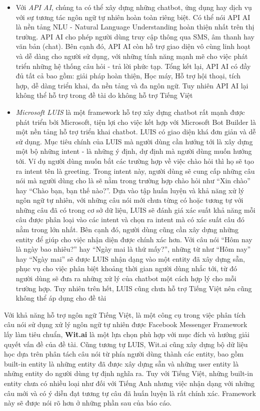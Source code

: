 \documentclass[12pt]{report}
\begin{document}
\begin{itemize}
	\item Với \textit{API AI}, chúng ta có thể xây dựng những chatbot, ứng dụng hay dịch vụ với sự tương tác ngôn ngữ tự nhiên hoàn toàn riêng biệt. Có thể nói API AI là nền tảng NLU - Natural Language Understanding hoàn thiện nhất trên thị trường. API AI cho phép người dùng truy cập thông qua SMS, âm thanh hay văn bản (chat). Bên cạnh đó, API AI còn hỗ trợ giao diện vô cùng linh hoạt và dễ dàng cho người sử dụng, với những tính năng mạnh mẽ cho việc phát triển những hệ thống câu hỏi - trả lời phức tạp. Tổng kết lại, API AI có đầy đủ tất cả bao gồm: giải pháp hoàn thiện, Học máy, Hỗ trợ hội thoại, tích hợp, dễ dàng triển khai, đa nền tảng và đa ngôn ngữ. Tuy nhiên API AI lại không thể hỗ trợ trong đề tài do không hỗ trợ Tiếng Việt
	\item \textit{Microsoft LUIS} là một framework hỗ trợ xây dựng chatbot rất mạnh được phát triển bởi Microsoft, tiện lợi cho việc kết hợp với Microsoft Bot Builder là một nền tảng hỗ trợ triển khai chatbot. LUIS có giao diện khá đơn giản và dễ sử dụng. Mục tiêu chính của LUIS mà người dùng cần hướng tới là xây dựng một bộ những intent - là những ý định, dự định mà người dùng muốn hướng tới. Ví dụ người dùng muốn bắt các trường hợp về việc chào hỏi thì họ sẽ tạo ra intent tên là greeting. Trong intent này, người dùng sẽ cung cấp những câu nói mà người dùng cho là sẽ nằm trong trường hợp chào hỏi như ``Xin chào'' hay ``Chào bạn, bạn thế nào?''. Dựa vào tập huấn luyện và khả năng xử lý ngôn ngữ tự nhiên, với những câu nói mới chưa từng có hoặc tương tự với những câu đã có trong cơ sở dữ liệu, LUIS sẽ đánh giá xác suất khả năng mỗi câu được phân loại vào các intent và chọn ra intent mà có xác suất câu đó nằm trong lớn nhất. Bên cạnh đó, người dùng cũng cần xây dựng những entity để giúp cho việc nhận diện được chính xác hơn. Với câu nói ``Hôm nay là ngày bao nhiêu?'' hay ``Ngày mai là thứ mấy?'', những từ như ``Hôm nay'' hay ``Ngày mai'' sẽ được LUIS nhận dạng vào một entity đã xây dựng sẵn, phục vụ cho việc phân biệt khoảng thời gian người dùng nhắc tới, từ đó người dùng sẽ đưa ra những xử lý của chatbot một cách hợp lý cho mỗi trường hợp. Tuy nhiên trên hết, LUIS cũng chưa hỗ trợ Tiếng Việt nên cũng không thể áp dụng cho đề tài
\end{itemize}

Với khả năng hỗ trợ ngôn ngữ Tiếng Việt, là một công cụ trong việc phân tích câu nói sử dụng xử lý ngôn ngữ tự nhiên được Facebook Messenger Framework lấy làm tiêu chuẩn, \textbf{Wit.ai} là một lựa chọn phù hợp với mục đích và hướng giải quyết vấn đề của đề tài. Cũng tương tự LUIS, Wit.ai cũng xây dựng bộ dữ liệu học dựa trên phân tách câu nói từ phía người dùng thành các entity, bao gồm built-in entity là những entity đã được xây dựng sẵn và những user entity là những entity do người dùng tự định nghĩa ra. Tuy với Tiếng Việt, những built-in entity chưa có nhiều loại như đối với Tiếng Anh nhưng việc nhận dạng với những câu mới và có ý diễn đạt tương tự câu đã huấn luyện là rất chính xác. Framework này sẽ được nói rõ hơn ở những phần sau của báo cáo.
\end{document}
